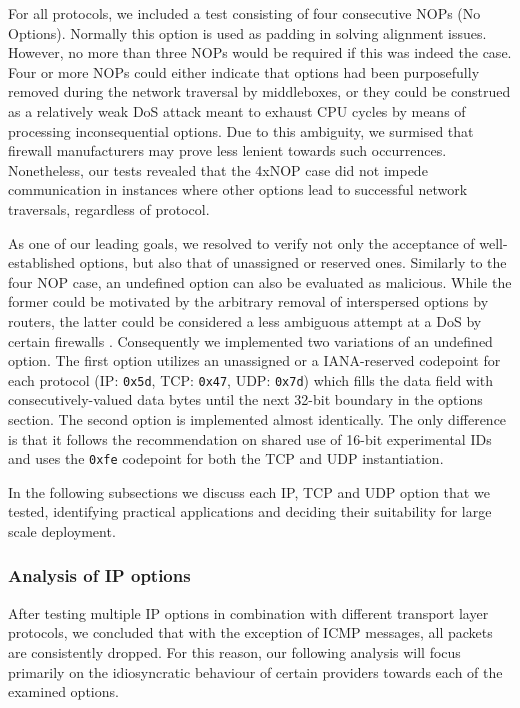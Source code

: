 

For all protocols, we included a test consisting of four consecutive NOPs (No Options). Normally this option is used as padding in solving alignment issues. However, no more than three NOPs would be required if this was indeed the case. Four or more NOPs could either indicate that options had been purposefully removed during the network traversal by middleboxes, or they could be construed as a relatively weak DoS attack meant to exhaust CPU cycles by means of processing inconsequential options. Due to this ambiguity, we surmised that firewall manufacturers may prove less lenient towards such occurrences. Nonetheless, our tests revealed that the 4xNOP case did not impede communication in instances where other options lead to successful network traversals, regardless of protocol.

As one of our leading goals, we resolved to verify not only the acceptance of well-established options, but also that of unassigned or reserved ones. Similarly to the four NOP case, an undefined option can also be evaluated as malicious. While the former could be motivated by the arbitrary removal of interspersed options by routers, the latter could be considered a less ambiguous attempt at a DoS by certain firewalls \cite{I-D.ietf-tsvwg-udp-options}. Consequently we implemented two variations of an undefined option. The first option utilizes an unassigned or a IANA-reserved codepoint for each protocol (IP: \texttt{0x5d}, TCP: \texttt{0x47}, UDP: \texttt{0x7d}) which fills the data field with consecutively-valued data bytes until the next 32-bit boundary in the options section. The second option is implemented almost identically. The only difference is that it follows the recommendation on shared use of 16-bit experimental IDs and uses the \texttt{0xfe} codepoint for both the TCP and UDP instantiation.

In the following subsections we discuss each IP, TCP and UDP option that we tested, identifying practical applications and deciding their suitability for large scale deployment.


\subsubsection{Analysis of IP options}
\label{extend:ops:evaluation:ip-ops}

After testing multiple IP options in combination with different transport layer protocols, we concluded that with the exception of ICMP messages, all packets are consistently dropped. For this reason, our following analysis will focus primarily on the idiosyncratic behaviour of certain providers towards each of the examined options.

